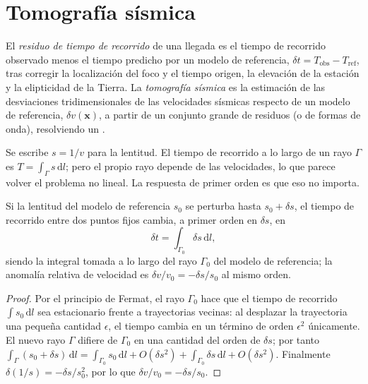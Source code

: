 \section{Tomografía sísmica}\label{sec:b3:seismology-imaging:tomography}

\begin{definition}\label{def:b3:seismology-imaging:tomography}
El \emph{residuo de tiempo de recorrido} de una llegada es el
tiempo de recorrido observado menos el tiempo predicho por un modelo de referencia,
$\delta t = T_{\text{obs}} - T_{\text{ref}}$, tras corregir la localización del
foco y el tiempo origen, la elevación de la estación y la
elipticidad de la Tierra. La \emph{tomografía sísmica} es la
estimación de las desviaciones tridimensionales de las velocidades sísmicas respecto de
un modelo de referencia, $\delta v(\mathbf x)$, a partir de un conjunto grande de residuos (o de
formas de onda), resolviendo un .
\end{definition}

Se escribe $s = 1/v$ para la lentitud. El tiempo de recorrido a lo largo de un rayo $\Gamma$ es
$T = \int_\Gamma s\,\mathrm dl$; pero el propio rayo depende de las velocidades,
lo que parece volver el problema no lineal. La respuesta de primer orden es que
eso no importa.

\begin{proposition}\label{prop:b3:seismology-imaging:linear}
Si la lentitud del modelo de referencia $s_0$ se perturba hasta $s_0 + \delta s$,
el tiempo de recorrido entre dos puntos fijos cambia, a primer orden en
$\delta s$, en
\[
  \delta t = \int_{\Gamma_0}\delta s\,\mathrm dl ,
\]
siendo la integral tomada a lo largo del rayo $\Gamma_0$ del modelo de referencia; la
anomalía relativa de velocidad es $\delta v/v_0 = -\delta s/s_0$ al mismo orden.
\end{proposition}

\begin{proof}
Por el principio de Fermat, el rayo $\Gamma_0$ hace que el tiempo de recorrido
$\int s_0\,\mathrm dl$ sea estacionario frente a trayectorias vecinas: al desplazar la trayectoria una
pequeña cantidad $\epsilon$, el tiempo cambia en un término de orden $\epsilon^2$ únicamente.
El nuevo rayo $\Gamma$ difiere de $\Gamma_0$ en una cantidad del orden de $\delta s$;
por tanto $\int_\Gamma(s_0 + \delta s)\,\mathrm dl = \int_{\Gamma_0}s_0\,\mathrm dl +
O(\delta s^2) + \int_{\Gamma_0}\delta s\,\mathrm dl + O(\delta s^2)$. Finalmente
$\delta(1/s) = -\delta s/s_0^2$, por lo que $\delta v/v_0 = -\delta s/s_0$.
\end{proof}

